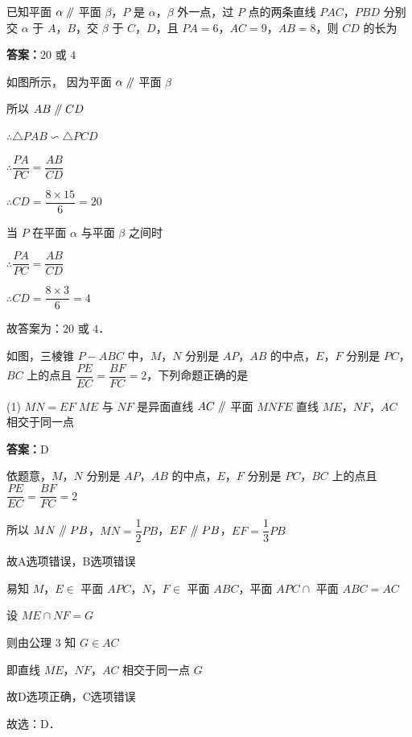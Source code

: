 \begin{example}[\bkstar{3}{5}]
已知平面 $\alpha\mathrel{/\mkern-5mu/}$ 平面 $\beta$，$P$ 是 $\alpha$，$\beta$ 外一点，过 $P$ 点的两条直线 $PAC$，$PBD$ 分别交 $\alpha$ 于 $A$，$B$，交 $\beta$ 于 $C$，$D$，且 $PA=6$，$AC=9$，$AB=8$，则 $CD$ 的长为
\end{example}
\begin{solution}
\textbf{答案：}$20$ 或 $4$

如图所示，
因为平面 $\alpha\mathrel{/\mkern-5mu/}$ 平面 $\beta$

所以 $AB\mathrel{/\mkern-5mu/} CD$

$\therefore \triangle PAB\backsim\triangle PCD$

$\therefore \dfrac{PA}{PC}=\dfrac{AB}{CD}$

$\therefore CD=\dfrac{8\times 15}{6}=20$

当 $P$ 在平面 $\alpha$ 与平面 $\beta$ 之间时

$\therefore \dfrac{PA}{PC}=\dfrac{AB}{CD}$

$\therefore CD=\dfrac{8\times 3}{6}=4$

故答案为：$20$ 或 $4$．
\end{solution}

\vspace{2em}


\begin{example}[\bkstar{3}{5}]
如图，三棱锥 $P-ABC$ 中，$M$，$N$ 分别是 $AP$，$AB$ 的中点，$E$，$F$ 分别是 $PC$，$BC$ 上的点且 $\dfrac{PE}{EC}=\dfrac{BF}{FC}=2$，下列命题正确的是
\begin{tasks}(1)
    \task $MN=EF$
    \task $ME$ 与 $NF$ 是异面直线
    \task $AC\mathrel{/\mkern-5mu/}$ 平面 $MNFE$
    \task 直线 $ME$，$NF$，$AC$ 相交于同一点
\end{tasks}
\end{example}
\begin{solution}
\textbf{答案：}D

依题意，$M$，$N$ 分别是 $AP$，$AB$ 的中点，$E$，$F$ 分别是 $PC$，$BC$ 上的点且 $\dfrac{PE}{EC}=\dfrac{BF}{FC}=2$

所以 $MN\mathrel{/\mkern-5mu/} PB$，$MN=\dfrac{1}{2}PB$，$EF\mathrel{/\mkern-5mu/} PB$，$EF=\dfrac{1}{3}PB$

故A选项错误，B选项错误

易知 $M$，$E\in$ 平面 $APC$，$N$，$F\in$ 平面 $ABC$，平面 $APC\cap$ 平面 $ABC=AC$

设 $ME\cap NF=G$

则由公理 $3$ 知 $G\in AC$

即直线 $ME$，$NF$，$AC$ 相交于同一点 $G$

故D选项正确，C选项错误

故选：D．
\end{solution}

